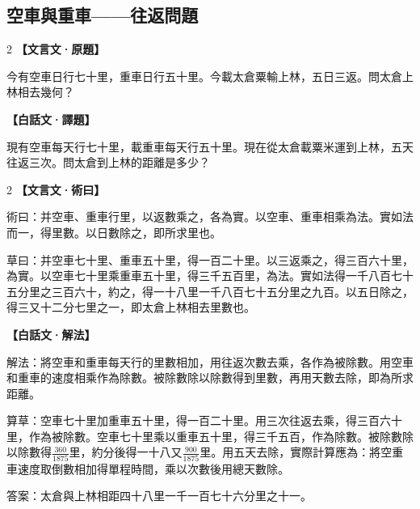 \documentclass[11pt,a4paper]{article}
\newcommand{\zhc}{}[1]{{\CJKfamily{\CJKrmdefault}#1}}  %
\newcommand{\zhm}[1]{{\CJKfamily{\CJKrmdefault}#1}}  %
\newenvironment{prob bilingual}[1][]{%
  \begin{paracol}{2}%
  \setlength{\columnseprule}{0.4pt}%
}{%
  \end{paracol}%
  \medskip%
}
\begin{document}
\vspace{0.5cm}

\subsection{\zhc{空車與重車——往返問題}}

\begin{paracol}{2}
\switchcolumn[0]
\noindent\textbf{\textcolor{notecolor}{\zhc{【文言文·原題】}}}\par\smallskip
\zhc{
今有空車日行七十里，重車日行五十里。今載太倉粟輸上林，五日三返。問太倉上林相去幾何？
}

\switchcolumn[1]
\noindent\textbf{\textcolor{notecolor}{\zhm{【白話文·譯題】}}}\par\smallskip
\zhm{
現有空車每天行七十里，載重車每天行五十里。現在從太倉載粟米運到上林，五天往返三次。問太倉到上林的距離是多少？
}
\end{paracol}

\medskip

\begin{paracol}{2}
\switchcolumn[0]
\noindent\textbf{\textcolor{notecolor}{\zhc{【文言文·術曰】}}}\par\smallskip
\zhc{
術曰：并空車、重車行里，以返數乘之，各為實。以空車、重車相乘為法。實如法而一，得里數。以日數除之，即所求里也。

草曰：并空車七十里、重車五十里，得一百二十里。以三返乘之，得三百六十里，為實。以空車七十里乘重車五十里，得三千五百里，為法。實如法得一千八百七十五分里之三百六十，約之，得一十八里一千八百七十五分里之九百。以五日除之，得三又十二分七里之一，即太倉上林相去里數也。
}

\switchcolumn[1]
\noindent\textbf{\textcolor{notecolor}{\zhm{【白話文·解法】}}}\par\smallskip
\zhm{
解法：將空車和重車每天行的里數相加，用往返次數去乘，各作為被除數。用空車和重車的速度相乘作為除數。被除數除以除數得到里數，再用天數去除，即為所求距離。

算草：空車七十里加重車五十里，得一百二十里。用三次往返去乘，得三百六十里，作為被除數。空車七十里乘以重車五十里，得三千五百，作為除數。被除數除以除數得$\frac{360}{1875}$里，約分後得一十八又$\frac{900}{1875}$里。用五天去除，實際計算應為：將空重車速度取倒數相加得單程時間，乘以次數後用總天數除。

答案：太倉與上林相距四十八里一千一百七十六分里之十一。
}
\end{paracol}

\vspace{0.5cm}
\end{document}
